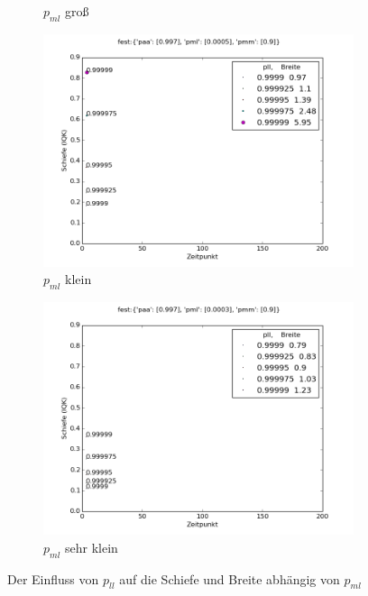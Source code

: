 \begin{figure}
\begin{subfigure}[t]{0.49\textwidth}
\caption{$p_{ml}$ groß}
\label{einfluss_pll_pml+}
\end{subfigure}
\vspace*{7mm}
\begin{subfigure}[b]{0.49\textwidth}
\includegraphics[width=\textwidth]{bilder/pll/3fest_09_00005_0997_p}
\caption{$p_{ml}$ klein}
\label{einfluss_pll_pml-}
\end{subfigure}
\begin{subfigure}[b]{0.49\textwidth}
\includegraphics[width=\textwidth]{bilder/pll/3fest_09_00003_0997_p}
\caption{$p_{ml}$ sehr klein}
\label{einfluss_pll_pml--}
\end{subfigure}
\caption{Der Einfluss von $p_{ll}$ auf die Schiefe und Breite abhängig von $p_{ml}$}
\label{einfluss_pll_pml}
\end{figure}

